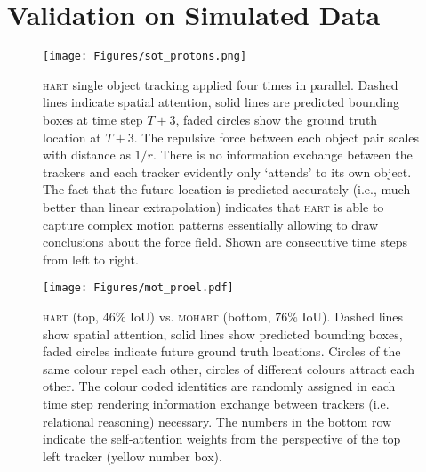 \section{Validation on Simulated Data} %
\label{sec:experiment_toy}

\begin{figure}%
    \centering
    \texttt{[image: Figures/sot\_protons.png]}
    \vspace{-3mm}
    \caption{\textsc{hart} single object tracking applied four times in parallel. Dashed lines indicate spatial attention, solid lines are predicted bounding boxes at time step $T+3$, faded circles show the ground truth location at $T+3$. The repulsive force between each object pair scales with distance as $1/r$. There is no information exchange between the trackers and each tracker evidently only `attends' to its own object. The fact that the future location is predicted accurately (i.e., much better than linear extrapolation) indicates that \textsc{hart} is able to capture complex motion patterns essentially allowing to draw conclusions about the force field. Shown are consecutive time steps from left to right.
    }
    \label{fig:toy1}
\end{figure} 
\begin{figure}%
    \centering
    \texttt{[image: Figures/mot\_proel.pdf]}
    \vspace{-3mm}
    \caption{\textsc{hart} (top, $46\%$ IoU) vs. \textsc{mohart} (bottom, $76\%$ IoU). Dashed lines show spatial attention, solid lines show predicted bounding boxes, faded circles indicate future ground truth locations. Circles of the same colour repel each other, circles of different colours attract each other. The colour coded identities are randomly assigned in each time step rendering information exchange between trackers (i.e. relational reasoning) necessary. The numbers in the bottom row indicate the self-attention weights from the perspective of the top left tracker (yellow number box).
    \vspace{-3mm}
    }
    \label{fig:toy2}
\end{figure}


